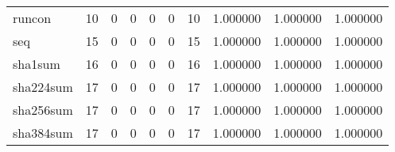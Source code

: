 \begin{longtable}{lrrrrrrrrr}
runcon    &                                      10 &                                                  0 &                                                  0 &                                                  0 &                                                  0 &                                                 10 &                                           1.000000 &                               1.000000 &                             1.000000 \\
seq       &                                      15 &                                                  0 &                                                  0 &                                                  0 &                                                  0 &                                                 15 &                                           1.000000 &                               1.000000 &                             1.000000 \\
sha1sum   &                                      16 &                                                  0 &                                                  0 &                                                  0 &                                                  0 &                                                 16 &                                           1.000000 &                               1.000000 &                             1.000000 \\
sha224sum &                                      17 &                                                  0 &                                                  0 &                                                  0 &                                                  0 &                                                 17 &                                           1.000000 &                               1.000000 &                             1.000000 \\
sha256sum &                                      17 &                                                  0 &                                                  0 &                                                  0 &                                                  0 &                                                 17 &                                           1.000000 &                               1.000000 &                             1.000000 \\
sha384sum &                                      17 &                                                  0 &                                                  0 &                                                  0 &                                                  0 &                                                 17 &                                           1.000000 &                               1.000000 &                             1.000000 \\

\end{longtable}

